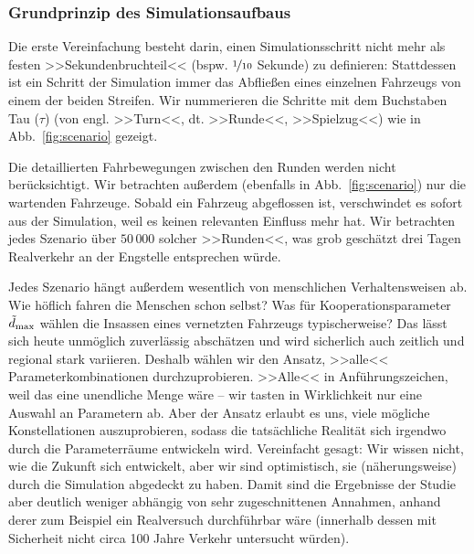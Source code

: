 

\subsubsection{Grundprinzip des Simulationsaufbaus}

Die erste Vereinfachung besteht darin, einen Simulationsschritt nicht mehr als festen >>Sekundenbruchteil<< (bspw. $\nicefrac{1}{10}$ Sekunde) zu definieren: Stattdessen ist ein Schritt der Simulation immer das Abfließen eines einzelnen Fahrzeugs von einem der beiden Streifen. Wir nummerieren die Schritte mit dem Buchstaben Tau ($\tau$) (von engl. >>Turn<<, dt. >>Runde<<, >>Spielzug<<) wie in Abb.~\ref{fig:scenario} gezeigt.

Die detaillierten Fahrbewegungen zwischen den Runden werden nicht berücksichtigt. Wir betrachten außerdem (ebenfalls in Abb.~\ref{fig:scenario}) nur die wartenden Fahrzeuge. Sobald ein Fahrzeug abgeflossen ist, verschwindet es sofort aus der Simulation, weil es keinen relevanten Einfluss mehr hat. Wir betrachten jedes Szenario über $50\,000$ solcher >>Runden<<, was grob geschätzt drei Tagen Realverkehr an der Engstelle entsprechen würde.

Jedes Szenario hängt außerdem wesentlich von menschlichen Verhaltensweisen ab. Wie höflich fahren die Menschen schon selbst? Was für Kooperationsparameter $\tilde{d}_{\text{max}}$ wählen die Insassen eines vernetzten Fahrzeugs typischerweise? Das lässt sich heute unmöglich zuverlässig abschätzen und wird sicherlich auch zeitlich und regional stark variieren. Deshalb wählen wir den Ansatz, >>alle<< Parameterkombinationen durchzuprobieren. >>Alle<< in Anführungszeichen, weil das eine unendliche Menge wäre -- wir tasten in Wirklichkeit nur eine Auswahl an Parametern ab. Aber der Ansatz erlaubt es uns, viele mögliche Konstellationen auszuprobieren, sodass die tatsächliche Realität sich irgendwo durch die Parameterräume entwickeln wird. Vereinfacht gesagt: Wir wissen nicht, wie die Zukunft sich entwickelt, aber wir sind optimistisch, sie (näherungsweise) durch die Simulation abgedeckt zu haben. Damit sind die Ergebnisse der Studie aber deutlich weniger abhängig von sehr zugeschnittenen Annahmen, anhand derer zum Beispiel ein Realversuch durchführbar wäre (innerhalb dessen mit Sicherheit nicht circa 100 Jahre Verkehr untersucht würden).

